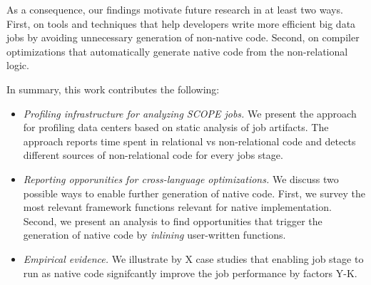 As a consequence, our findings motivate future research in at least two ways.
First, on tools and techniques that help developers write more efficient big data jobs by avoiding unnecessary generation of non-native code. 
Second, on compiler optimizations that automatically generate native code from the non-relational logic.


In summary, this work contributes the following:
\begin{itemize}
\item \emph{Profiling infrastructure for analyzing SCOPE jobs.} 
We present the approach for profiling data centers based on static analysis of job artifacts. 
The approach reports time spent in relational vs non-relational code and detects different sources of non-relational code for every jobs stage. 

\item \emph{Reporting opporunities for cross-language optimizations.} We discuss two possible ways to enable further generation of native code. 
First, we survey the most relevant framework functions relevant for native implementation. 
Second, we present an analysis to find opportunities that trigger the generation of native code by \emph{inlining} user-written functions.  

\item \emph{Empirical evidence.} 
We illustrate by X case studies that enabling job stage to run as native code signifcantly improve the job performance by factors Y-K.
\end{itemize}


